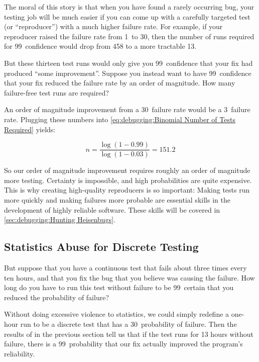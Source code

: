 The moral of this story is that when you have found a rarely occurring
bug, your testing job will be much easier if you can come up with
a carefully targeted test (or ``reproducer'') with a much higher failure rate.
For example, if your reproducer raised the failure rate from 1\pct\
to 30\pct, then the number of runs required for 99\pct\ confidence
would drop from 458 to a more tractable 13.

But these thirteen test runs would only give you 99\pct\ confidence that
your fix had produced ``some improvement''.
Suppose you instead want to have 99\pct\ confidence that your fix reduced
the failure rate by an order of magnitude.
How many failure-free test runs are required?

An order of magnitude improvement from a 30\pct\ failure rate would be
a 3\pct\ failure rate.
Plugging these numbers into
\cref{eq:debugging:Binomial Number of Tests Required} yields:

\begin{equation}
	n = \frac{\log\left(1 - 0.99\right)}{\log\left(1 - 0.03\right)} = 151.2
\end{equation}

So our order of magnitude improvement requires roughly an order of
magnitude more testing.
Certainty is impossible, and high probabilities are quite expensive.
This is why creating high-quality reproducers is so important:
Making tests run more quickly and making failures more
probable are essential skills in the development of highly reliable
software.
These skills will be covered in
\cref{sec:debugging:Hunting Heisenbugs}.

\subsection{Statistics Abuse for Discrete Testing}
\label{sec:debugging:Statistics Abuse for Discrete Testing}

But suppose that you have a continuous test that fails about three
times every ten hours, and that you fix the bug that you believe was
causing the failure.
How long do you have to run this test without failure to be 99\pct\ certain
that you reduced the probability of failure?

Without doing excessive violence to statistics, we could simply
redefine a one-hour run to be a discrete test that has a 30\pct\
probability of failure.
Then the results of in the previous section tell us that if the test
runs for 13 hours without failure, there is a 99\pct\ probability that
our fix actually improved the program's reliability.

